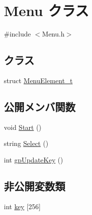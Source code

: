 \hypertarget{class_menu}{\section{Menu クラス}
\label{class_menu}
}


{\ttfamily \#include $<$Menu.\+h$>$}

\subsection*{クラス}
\begin{DoxyCompactItemize}
\item 
struct \hyperlink{struct_menu_1_1_menu_element__t}{Menu\+Element\+\_\+t}
\end{DoxyCompactItemize}
\subsection*{公開メンバ関数}
\begin{DoxyCompactItemize}
\item 
void \hyperlink{class_menu_af24259cfce6f1beeb1e547735c3126be}{Start} ()
\item 
string \hyperlink{class_menu_a0c448739883a9e61e4ddd52ffde097da}{Select} ()
\item 
int \hyperlink{class_menu_a23303ace170484ab0663b18f75156df1}{gp\+Update\+Key} ()
\end{DoxyCompactItemize}
\subsection*{非公開変数類}
\begin{DoxyCompactItemize}
\item 
int \hyperlink{class_menu_a6a356e223f85e7957ffba91bdf634a56}{key} \mbox{[}256\mbox{]}
\end{DoxyCompactItemize}


